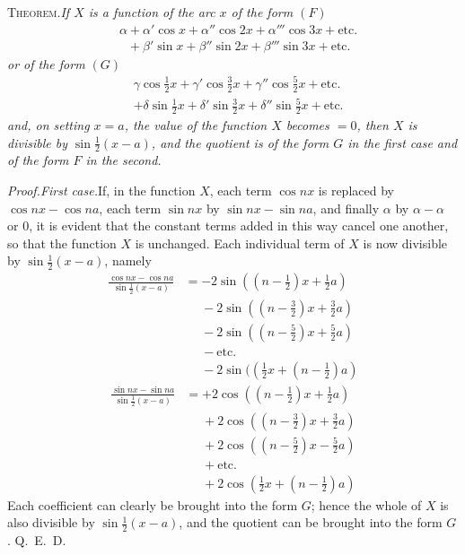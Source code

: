 \begingroup
\renewcommand{\arraystretch}{1.45}
\textsc{Theorem.}\quad\textit{If $X$ is a function of the arc $x$ of the form $(F)$}
\[
\begin{aligned}
&\alpha+\alpha'\cos x+\alpha''\cos 2x+\alpha'''\cos 3x+\text{etc.}\\[5pt]
&\phantom{\alpha}+\beta'\sin x+\beta''\sin 2x+\beta'''\sin 3x+\text{etc.}
\end{aligned}
\]
\textit{or of the form $(G)$}
\[
\begin{aligned}
&\gamma\cos\tfrac12x+\gamma'\cos\tfrac32x+\gamma''\cos\tfrac52x+\text{etc.}\\[5pt]
&+\delta\sin\tfrac12x+\delta'\sin\tfrac32x+\delta''\sin\tfrac52x+\text{etc.}
\end{aligned}
\]
\textit{and, on setting $x=a$, the value of the function $X$ becomes $=0$, then $X$ is divisible by $\sin\tfrac12(x-a)$, and the quotient is of the form $G$ in the first case and of the form $F$ in the second.}

\textit{Proof.\quad First case.}\quad If, in the function $X$, each term $\cos nx$ is replaced by $\cos nx-\cos na$, each term $\sin nx$ by $\sin nx-\sin na$,
and finally $\alpha$ by $\alpha-\alpha$ or $0$, it is evident that the constant terms added in this way cancel one another, so that the function $X$ is unchanged. Each individual term of $X$ is now divisible by $\sin\tfrac12(x-a)$, namely
\[
\begin{aligned}
\frac{\cos nx-\cos na}{\sin\tfrac12(x-a)}
&=-2\sin((n-\tfrac12)x+\tfrac12a)\\[5pt]
&\phantom{=}{-}2\sin((n-\tfrac32)x+\tfrac32a)\\[5pt]
&\phantom{=}{-}2\sin((n-\tfrac52)x+\tfrac52a)\\[5pt]
&\phantom{=}{-}\text{etc.}\\[5pt]
&\phantom{=}{-}2\sin((\tfrac12x+(n-\tfrac12)a)
\end{aligned}
\]
\[
\begin{aligned}
\frac{\sin nx-\sin na}{\sin\tfrac12(x-a)}
&=+2\cos((n-\tfrac12)x+\tfrac12a)\\[5pt]
&\phantom{=}{+}2\cos((n-\tfrac32)x+\tfrac32a)\\[5pt]
&\phantom{=}{+}2\cos((n-\tfrac52)x-\tfrac52a)\\[5pt]
&\phantom{=}{+}\text{etc.}\\[5pt]
&\phantom{=}{+}2\cos(\tfrac12x+(n-\tfrac12)a)
\end{aligned}
\]
Each coefficient can clearly be brought into the form $G$; hence the whole of $X$ is also divisible by $\sin\tfrac12(x-a)$, and the quotient can be brought into the form $G$. Q.~E.~D.

